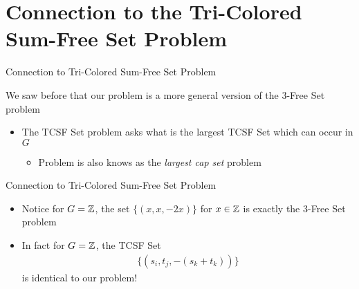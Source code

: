 \section{Connection to the Tri-Colored Sum-Free Set Problem}
\begin{frame}{Connection to Tri-Colored Sum-Free Set Problem}

We saw before that our problem is a more general version of the 3-Free Set problem	



\begin{itemize}
\item<5-> The TCSF Set problem asks what is the largest TCSF Set which can occur in $G$
\begin{itemize}
	\item Problem is also knows as the {\em largest cap set} problem
\end{itemize}

\end{itemize}
\end{frame}

\begin{frame}{Connection to Tri-Colored Sum-Free Set Problem}
\begin{itemize}
	
	\item Notice for $G = {\mathbb Z}$, the set $\{(x, x, -2x)\}$ for $x \in {\mathbb Z}$ is exactly the 3-Free Set problem
	
	\item<2> In fact for $G= {\mathbb Z}$, the TCSF Set
	\begin{align*}
		\{ (s_i, t_j, -(s_k+t_k)) \}
	\end{align*} 
	is identical to our problem!
\end{itemize}
\end{frame}

